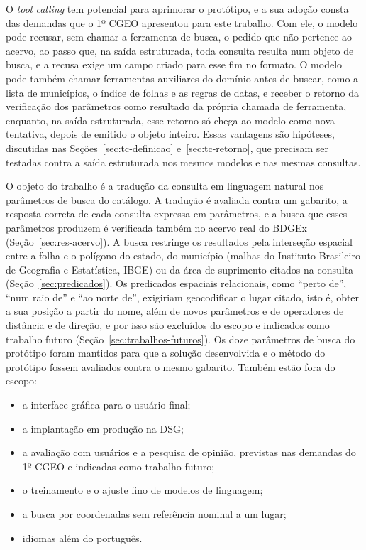 O \textit{tool calling} tem potencial para aprimorar o protótipo, e a sua adoção consta das demandas que o 1º CGEO apresentou para este trabalho. Com ele, o modelo pode recusar, sem chamar a ferramenta de busca, o pedido que não pertence ao acervo, ao passo que, na saída estruturada, toda consulta resulta num objeto de busca, e a recusa exige um campo criado para esse fim no formato. O modelo pode também chamar ferramentas auxiliares do domínio antes de buscar, como a lista de municípios, o índice de folhas e as regras de datas, e receber o retorno da verificação dos parâmetros como resultado da própria chamada de ferramenta, enquanto, na saída estruturada, esse retorno só chega ao modelo como nova tentativa, depois de emitido o objeto inteiro. Essas vantagens são hipóteses, discutidas nas Seções~\ref{sec:tc-definicao} e~\ref{sec:tc-retorno}, que precisam ser testadas contra a saída estruturada nos mesmos modelos e nas mesmas consultas.

O objeto do trabalho é a tradução da consulta em linguagem natural nos parâmetros de busca do catálogo. A tradução é avaliada contra um gabarito, a resposta correta de cada consulta expressa em parâmetros, e a busca que esses parâmetros produzem é verificada também no acervo real do BDGEx (Seção~\ref{sec:res-acervo}). A busca restringe os resultados pela interseção espacial entre a folha e o polígono do estado, do município (malhas do Instituto Brasileiro de Geografia e Estatística, IBGE) ou da área de suprimento citados na consulta (Seção~\ref{sec:predicados}). Os predicados espaciais relacionais, como ``perto de'', ``num raio de'' e ``ao norte de'', exigiriam geocodificar o lugar citado, isto é, obter a sua posição a partir do nome, além de novos parâmetros e de operadores de distância e de direção, e por isso são excluídos do escopo e indicados como trabalho futuro (Seção~\ref{sec:trabalhos-futuros}). Os doze parâmetros de busca do protótipo foram mantidos para que a solução desenvolvida e o método do protótipo fossem avaliados contra o mesmo gabarito. Também estão fora do escopo:
\begin{itemize}
  \item a interface gráfica para o usuário final;
  \item a implantação em produção na DSG;
  \item a avaliação com usuários e a pesquisa de opinião, previstas nas demandas do 1º CGEO e indicadas como trabalho futuro;
  \item o treinamento e o ajuste fino de modelos de linguagem;
  \item a busca por coordenadas sem referência nominal a um lugar;
  \item idiomas além do português.
\end{itemize}

